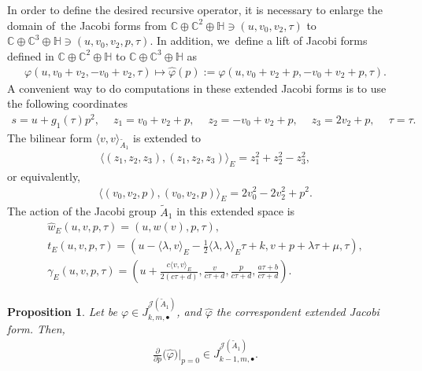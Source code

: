 \documentclass[10pt,a4paper]{amsart}
\numberwithin{equation}{section}
\newtheorem{Proposition}[Theorem]{Proposition}
 { \theoremstyle{definition}
\newtheorem{Definition}[Theorem]{Definition}
\newtheorem{Remark}[Theorem]{Remark} }
\newcommand{\Ja}{\mathcal{J}}
\begin{document}
In order to define the desired recursive operator, it is necessary to enlarge the domain of~the Jacobi forms from $\mathbb{C}\oplus\mathbb{C}^2\oplus\mathbb{H}\ni (u,v_0,v_2,\tau)$ to $\mathbb{C}\oplus\mathbb{C}^3\oplus\mathbb{H}\ni (u,v_0,v_2,p,\tau)$. In addition, we~define a lift of Jacobi forms defined in $ \mathbb{C}\oplus\mathbb{C}^2\oplus\mathbb{H}$ to $\mathbb{C}\oplus\mathbb{C}^3\oplus\mathbb{H}$ as
\begin{gather*}
\varphi(u,v_0+v_2,-v_0+v_2,\tau)\mapsto \hat\varphi(p):=\varphi(u,v_0+v_2+p,-v_0+v_2+p,\tau).
\end{gather*}
A convenient way to do computations in these extended Jacobi forms is to use the following coordinates
\begin{gather*}
s=u+g_1(\tau)p^2,\quad\
z_1=v_0+v_2+p,\quad\
z_2=-v_0+v_2+p,\quad\
z_3=2v_2+p,\quad\
\tau=\tau.
\end{gather*}
The bilinear form $\langle v,v \rangle_{\tilde A_1}$ is extended to
\begin{gather*}
\langle (z_1,z_2,z_3),(z_1,z_2,z_3) \rangle_E=z_1^2+z_2^2-z_3^2,
\end{gather*}
or equivalently,
\begin{gather*}
\langle (v_0,v_2,p),(v_0,v_2,p) \rangle_E=2v_0^2-2v_2^2+p^2.
\end{gather*}
The action of the Jacobi group $\tilde A_1$ in this extended space is
\begin{gather*}%
\hat w_E(u,v,p,\tau)=(u,w(v),p,\tau),
\\
t_E(u,v,p,\tau)=\left(u-\langle \lambda,v \rangle_{E}-\frac{1}{2}\langle \lambda,\lambda \rangle_{E}\tau+k,v+p+\lambda\tau+\mu,\tau\right),
\\
\gamma_E(u,v,p,\tau)=\left(u+\frac{c\langle v,v \rangle_{E}}{2(c\tau+d)},\frac{v}{c\tau+d},\frac{p}{c\tau+d},\frac{a\tau+b}{c\tau+d}\right).
\end{gather*}

\begin{Proposition}
Let be $\varphi\in J_{k, m,\bullet}^{\Ja(\tilde A_1)}$, and $\hat\varphi$ the correspondent extended Jacobi form. Then,
\begin{gather*}
\frac{\partial}{\partial p}\big(\hat\varphi\big)\bigg|_{p=0} \in J_{k-1, m,\bullet}^{\Ja(\tilde A_1)}.
\end{gather*}
\end{Proposition}
\end{document}
